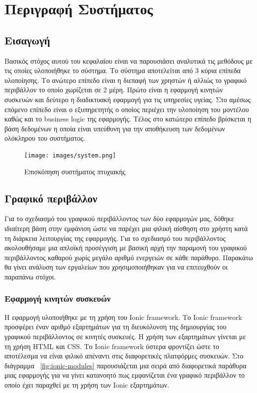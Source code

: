 \chapter{Περιγραφή Συστήματος}

\section{Εισαγωγή}
Βασικός στόχος αυτού του κεφαλαίου είναι να παρουσιάσει αναλυτικά τις μεθόδους με τις οποίες υλοποιήθηκε το σύστημα. Το σύστημα αποτελείται από 3 κύρια επίπεδα υλοποίησης. Το ανώτερο επίπεδο είναι η διεπαφή των χρηστών ή αλλιώς το γραφικό περιβάλλον το οποίο χωρίζεται σε 2 μέρη. Πρώτο είναι η εφαρμογή κινητών συσκευών και δεύτερο η διαδικτυακή εφαρμογή για τις υπηρεσίες υγείας. Στο αμέσως επόμενο επίπεδο είναι ο εξυπηρετητής ο οποίος περιέχει την υλοποίηση του μοντέλου καθώς και το business logic της εφαρμογής. Τέλος στο κατώτερο επίπεδο βρίσκεται η βάση δεδομένων η οποία είναι υπεύθυνη για την αποθήκευση των δεδομένων ολόκληρου του συστήματος.

\begin{figure}[h]
  \centering
  \texttt{[image: images/system.png]}
  \caption{Επισκόπηση συστήματος πτυχιακής}
  \label{fig:system}
\end{figure}

\section{Γραφικό περιβάλλον}
Για το σχεδιασμό του γραφικού περιβάλλοντος των δύο εφαρμογών μας, δόθηκε ιδιαίτερη βάση στην εμφάνιση ώστε να παρέχει μια φιλική αίσθηση στο χρήστη κατά τη διάρκεια λειτουργίας της εφαρμογής. Για το σχεδιασμό του περιβάλλοντος ακολουθήσαμε μια απλοϊκή προσέγγιση με βασική αρχή την παραμονή του γραφικού περιβάλλοντος καθαρού χωρίς μεγάλο αριθμό ενεργειών σε κάθε παράθυρο. Παρακάτω θα γίνει ανάλυση των εργαλείων που χρησιμοποιήθηκαν για να επιτευχθούν οι παραπάνω στόχοι. 

\subsection{Εφαρμογή κινητών συσκευών}
Η εφαρμογή υλοποιήθηκε με τη χρήση του Ionic framework. Το Ionic framework προσφέρει έναν αριθμό εξαρτημάτων για τη διευκόλυνση της δημιουργίας του γραφικού περιβάλλοντος σε κινητές συσκευές. Η χρήση των εξαρτημάτων γίνεται με τη χρήση HTML και CSS. Το Ionic framework ύστερα φροντίζει ώστε το αποτέλεσμα να είναι φιλικό απέναντι στις διαφορετικές πλατφόρμες συσκευών. Στο διάγραμμα ~\ref{fig:ionic-modules} παρουσιάζεται μια σειρά από διαφορετικά παράθυρα μιας εφαρμογής για να γίνει κατανοητό πως εμφανίζεται ένα γραφικό περιβάλλον το οποίο έχει παραχθεί με τη χρήση των Ionic εξαρτημάτων.

